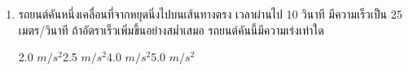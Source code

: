 \begin{enumerate}
	\item \runningj \nonet รถยนต์คันหนึ่งเคลื่อนที่จากหยุดนิ่งไปบนเส้นทางตรง  เวลาผ่านไป  10  วินาที  	มีความเร็วเป็น  25  เมตร/วินาที     ถ้าอัตราเร็วเพิ่มขึ้นอย่างสม่ำเสมอ   รถยนต์คันนี้มีความเร่งเท่าใด
	\begin{4c}
		{2.0 $m/s^2$}{2.5 $m/s^2$}{4.0 $m/s^2$}{5.0 $m/s^2$}
	\end{4c}
\end{enumerate}
